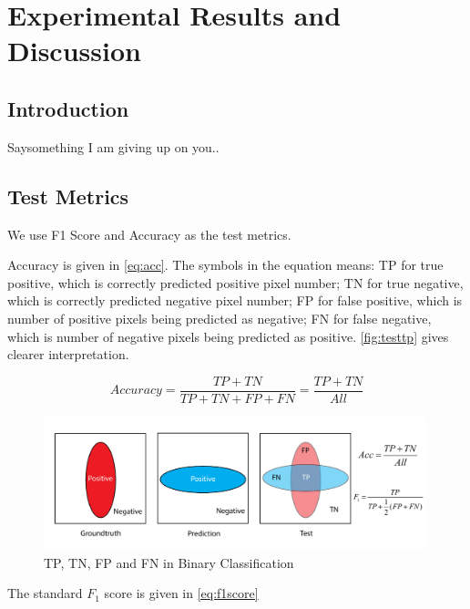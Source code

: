 
\chapter{Experimental Results and Discussion}
\label{cha:experiments}
\begin{spacing}{1.5}
\setlength{\parskip}{0.3in}

\section{Introduction}

Saysomething I am giving up on you..

\section{Test Metrics}

We use F1 Score and Accuracy as the test metrics.

Accuracy is given in \autoref{eq:acc}. The symbols in the equation means: TP for true positive, which is correctly predicted positive pixel number; TN for true negative, which is correctly predicted negative pixel number; FP for false positive, which is number of positive pixels being predicted as negative; FN for false negative, which is number of negative pixels being predicted as positive. \autoref{fig:testtp} gives clearer interpretation.

\begin{equation}
\label{eq:acc}
    Accuracy=\frac{TP+TN}{TP+TN+FP+FN}=\frac{TP+TN}{All}
\end{equation}

\begin{figure}[ht]
\centering
\includegraphics[width=0.99\textwidth, fbox]{Chapter5/testtp.pdf}
\caption{TP, TN, FP and FN in Binary Classification}
\label{fig:testtp} 
\end{figure}

The standard $F_1$ score is given in \autoref{eq:f1score}


\end{spacing}
